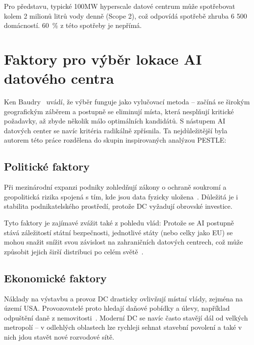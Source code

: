 Pro představu, typické 100MW hyperscale datové centrum může spotřebovat kolem 2 milionů litrů vody denně (Scope 2), což odpovídá spotřebě zhruba 6 500 domácností. 60~\% z této spotřeby je nepřímá.~\cite{international_energy_agency_iea_energy_2025}


\section{Faktory pro výběr lokace AI datového centra}
\label{sec:lokalita}


Ken Baudry~\cite{geng_data_2014} uvádí, že výběr funguje jako vylučovací metoda -- začíná se širokým geografickým záběrem a postupně se eliminují místa, která nesplňují kritické požadavky, až zbyde několik málo optimálních kandidátů. S nástupem AI datových center se navíc kritéria radikálně zpřísnila. Ta nejdůležitější byla autorem této práce rozdělena do skupin inspirovaných analýzou PESTLE:

\subsection{Politické faktory}
\label{subsec:pestle_po}

Při mezinárodní expanzi podniky zohledňují zákony o ochraně soukromí a geopolitická rizika spojená s tím, kde jsou data fyzicky uložena~\cite[s.~96]{geng_data_2014}. Důležitá je i stabilita podnikatelského prostředí, protože DC vyžadují obrovské investice.

Tyto faktory je zajímavé zvážit také z pohledu vlád: Protože se AI postupně stává záležitostí státní bezpečnosti, jednotlivé státy (nebo celky jako EU) se mohou snažit snížit svou závislost na zahraničních datových centrech, což může způsobit jejich širší distribuci po celém světě~\cite[s.~25]{pilz_compute_2023}. 

\subsection{Ekonomické faktory}
\label{subsec:pestle_ec}

Náklady na výstavbu a provoz DC drasticky ovlivňují místní vlády, zejména na území USA. Provozovatelé proto hledají daňové pobídky a úlevy, například odpuštění daně z nemovitosti~\cite[s.~97--89]{geng_data_2014}. Moderní DC se navíc často stavějí dál od velkých metropolí -- v odlehlých oblastech lze rychleji sehnat stavební povolení a také v nich jdou stavět nové rozvodové sítě.~\cite[s.~25]{pilz_compute_2023}

